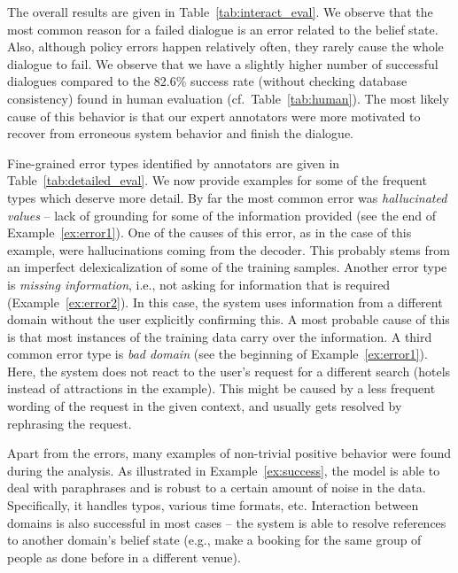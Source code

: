 \documentclass[11pt,a4paper]{article}
\newcommand{\exampleref}[1]{Example~\ref{#1}}
\begin{document}
The overall results are given in Table~\ref{tab:interact_eval}.
We observe that the most common reason for a failed dialogue is an error related to the belief state.
Also, although policy errors happen relatively often, they rarely cause the whole dialogue to fail.
We observe that we have a slightly higher number of successful dialogues compared to the 82.6\% success rate (without checking database consistency) found in human evaluation (cf.\ Table~\ref{tab:human}).
The most likely cause of this behavior is that our expert annotators were more motivated to recover from erroneous system behavior and finish the dialogue.

Fine-grained error types identified by annotators are given in Table~\ref{tab:detailed_eval}. We now provide examples for some of the frequent types which deserve more detail.
By far the most common error was \emph{hallucinated values} -- lack of grounding for some of the information provided (see the end of \exampleref{ex:error1}). One of the causes of this error, as in the case of this example, were hallucinations coming from the decoder. This probably stems from an imperfect delexicalization of some of the training samples.
Another error type is \emph{missing information}, i.e., not asking for information that is required (\exampleref{ex:error2}). In this case, the system uses information from a different domain without the user explicitly confirming this.
A most probable cause of this is that most instances of the training data carry over the information.
A third common error type is \emph{bad domain} (see the beginning of \exampleref{ex:error1}). Here, the system does not react to the user's request for a different search (hotels instead of attractions in the example). This might be caused by a less frequent wording of the request in the given context, and usually gets resolved by rephrasing the request.

Apart from the errors, many examples of non-trivial positive behavior were found during the analysis. As illustrated in Example~\ref{ex:success},
the model is able to deal with paraphrases and is robust to a certain amount of noise in the data. Specifically, it handles typos, various time formats, etc.
Interaction between domains is also successful in most cases -- the system is able to resolve references to another domain's belief state (e.g., make a booking for the same group of people as done before in a different venue).
\end{document}
